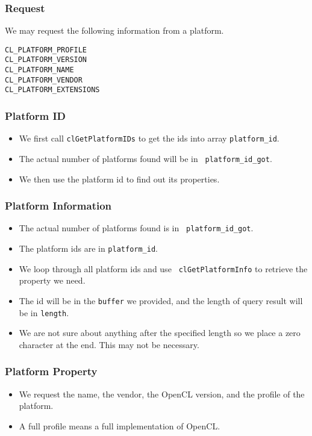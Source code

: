 \documentclass{beamer}
\begin{document}
\begin{frame}
  \frametitle{Request}
  We may request the following information from a platform.
  \begin{description}
  \item[\tt CL\_PLATFORM\_PROFILE]
  \item[\tt CL\_PLATFORM\_VERSION]
  \item[\tt CL\_PLATFORM\_NAME]
  \item[\tt CL\_PLATFORM\_VENDOR]
  \item[\tt CL\_PLATFORM\_EXTENSIONS]
  \end{description}
\end{frame}

\begin{frame}
  \frametitle{Platform ID}
  \begin{itemize}
  \item We first call {\tt clGetPlatformIDs} to get the ids into array
    {\tt platform\_id}.
  \item The actual number of platforms found will be in {\tt
    platform\_id\_got}.
  \item We then use the platform id to find out its properties.
  \end{itemize}
\end{frame}


\begin{frame}
  \frametitle{Platform Information}
  \begin{itemize}
  \item The actual number of platforms found is in {\tt
    platform\_id\_got}.
  \item The platform ids are in {\tt platform\_id}.
  \item We loop through all platform ids and use {\tt
    clGetPlatformInfo} to retrieve the property we need.
  \item The id will be in the {\tt buffer} we provided, and the length
    of query result will be in {\tt length}.
  \item We are not sure about anything after the specified length so
    we place a zero character at the end.  This may not be necessary.
  \end{itemize}
\end{frame}

\begin{frame}
  \frametitle{Platform Property}
  \begin{itemize}
  \item We request the name, the vendor, the OpenCL version, and the
    profile of the platform.
  \item A full profile means a full implementation of OpenCL.
  \end{itemize}
\end{frame}
\end{document}
